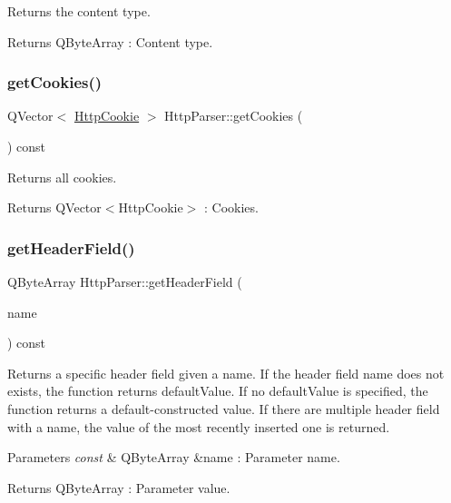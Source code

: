 Returns the content type. 

\begin{DoxyReturn}{Returns}
Q\+Byte\+Array \+: Content type. 
\end{DoxyReturn}
\mbox{\label{class_http_parser_adacd6d1e9e28ddb21e35d47a965506e3}} 
\subsubsection{\texorpdfstring{get\+Cookies()}{getCookies()}}
{\footnotesize\ttfamily Q\+Vector$<$ \hyperlink{class_http_cookie}{Http\+Cookie} $>$ Http\+Parser\+::get\+Cookies (\begin{DoxyParamCaption}{ }\end{DoxyParamCaption}) const}



Returns all cookies. 

\begin{DoxyReturn}{Returns}
Q\+Vector$<$\+Http\+Cookie$>$ \+: Cookies. 
\end{DoxyReturn}
\mbox{\label{class_http_parser_aa754b731300bd5cf6dc82fa038089aaa}} 
\subsubsection{\texorpdfstring{get\+Header\+Field()}{getHeaderField()}}
{\footnotesize\ttfamily Q\+Byte\+Array Http\+Parser\+::get\+Header\+Field (\begin{DoxyParamCaption}\item[{const Q\+Byte\+Array \&}]{name }\end{DoxyParamCaption}) const}



Returns a specific header field given a name. If the header field name does not exists, the function returns default\+Value. If no default\+Value is specified, the function returns a default-\/constructed value. If there are multiple header field with a name, the value of the most recently inserted one is returned. 


\begin{DoxyParams}{Parameters}
{\em const} & Q\+Byte\+Array \&name \+: Parameter name. \\
\hline
\end{DoxyParams}
\begin{DoxyReturn}{Returns}
Q\+Byte\+Array \+: Parameter value. 
\end{DoxyReturn}
\mbox{\label{class_http_parser_ad1db732c8824dd7e91653fd956fc3bf5}} 
